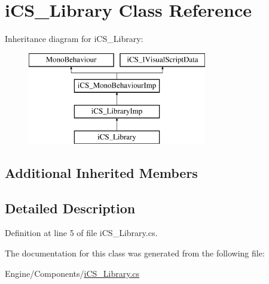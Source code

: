 \hypertarget{classi_c_s___library}{\section{i\+C\+S\+\_\+\+Library Class Reference}
\label{classi_c_s___library}
}
Inheritance diagram for i\+C\+S\+\_\+\+Library\+:\begin{figure}[H]
\begin{center}
\leavevmode
\includegraphics[height=4.000000cm]{classi_c_s___library}
\end{center}
\end{figure}
\subsection*{Additional Inherited Members}


\subsection{Detailed Description}


Definition at line 5 of file i\+C\+S\+\_\+\+Library.\+cs.



The documentation for this class was generated from the following file\+:\begin{DoxyCompactItemize}
\item 
Engine/\+Components/\hyperlink{i_c_s___library_8cs}{i\+C\+S\+\_\+\+Library.\+cs}\end{DoxyCompactItemize}
